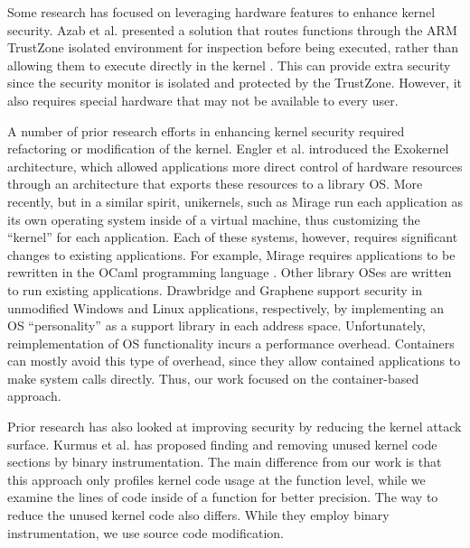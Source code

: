 Some research has focused on leveraging hardware features to enhance kernel security. 
Azab et al. \cite{10.1145/2660267.2660350} presented a solution that routes functions through the ARM TrustZone isolated environment for inspection before being executed, 
rather than allowing them to execute directly in the kernel \cite{ARM-TrustZone}. This can provide extra security since the security monitor is isolated and protected by the TrustZone. 
However, it also requires special hardware that may not be available to every user. 

A number of prior research efforts in enhancing kernel security required refactoring or modification of the kernel. 
Engler et al. \cite{Engler:1995:EOS:224056.224076} introduced the Exokernel architecture, which allowed applications more direct control of hardware resources through 
an architecture that exports these resources to a library OS. More recently, but in a similar spirit, unikernels, 
such as Mirage \cite{Madhavapeddy:2013:ULO:2451116.2451167} run each application as its own operating system inside of a virtual machine, 
thus customizing the “kernel” for each application. Each of these systems, however, requires significant changes to existing applications. 
For example, Mirage requires applications to be rewritten in the OCaml programming language \cite{OCaml}. Other library OSes are written to run existing applications. 
Drawbridge \cite{Porter:2011:RLO:1950365.1950399} and Graphene \cite{Tsai:2014:CSI:2592798.2592812} support security in unmodified Windows and Linux applications, 
respectively, by implementing an OS ``personality'' as a support library in each address space. Unfortunately, reimplementation of OS functionality incurs a performance overhead. 
Containers can mostly avoid this type of overhead, since they allow contained applications to make system calls directly. Thus, our work focused on the container-based approach. 

Prior research has also looked at improving security by reducing the kernel attack surface. Kurmus et al. \cite{10.1145/1972551.1972557} has proposed finding and removing 
unused kernel code sections by binary instrumentation. The main difference from our work is that this approach only profiles kernel code usage at the function level, 
while we examine the lines of code inside of a function for better precision. The way to reduce the unused kernel code also differs. 
While they employ binary instrumentation, we use source code modification.

